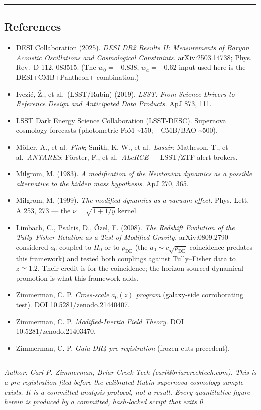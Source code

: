 \documentclass[
]{article}
\providecommand{\tightlist}{%
  \setlength{\itemsep}{0pt}\setlength{\parskip}{0pt}}
\begin{document}
\begin{center}\rule{0.5\linewidth}{0.5pt}\end{center}

\subsection{References}\label{references}

\begin{itemize}
\tightlist
\item
  DESI Collaboration (2025). \emph{DESI DR2 Results II: Measurements of
  Baryon Acoustic Oscillations and Cosmological Constraints.}
  arXiv:2503.14738; Phys. Rev.~D 112, 083515. (The
  \(w_0=-0.838,\,w_a=-0.62\) input used here is the DESI+CMB+Pantheon+
  combination.)
\item
  Ivezić, Ž., et al.~(LSST/Rubin) (2019). \emph{LSST: From Science
  Drivers to Reference Design and Anticipated Data Products.} ApJ 873,
  111.
\item
  LSST Dark Energy Science Collaboration (LSST-DESC). Supernova
  cosmology forecasts (photometric FoM \textasciitilde150; +CMB/BAO
  \textasciitilde500).
\item
  Möller, A., et al.~\emph{Fink}; Smith, K. W., et al.~\emph{Lasair};
  Matheson, T., et al.~\emph{ANTARES}; Förster, F., et al.~\emph{ALeRCE}
  --- LSST/ZTF alert brokers.
\item
  Milgrom, M. (1983). \emph{A modification of the Newtonian dynamics as
  a possible alternative to the hidden mass hypothesis.} ApJ 270, 365.
\item
  Milgrom, M. (1999). \emph{The modified dynamics as a vacuum effect.}
  Phys. Lett. A 253, 273 --- the \(\nu=\sqrt{1+1/y}\) kernel.
\item
  Limbach, C., Psaltis, D., Özel, F. (2008). \emph{The Redshift
  Evolution of the Tully--Fisher Relation as a Test of Modified
  Gravity.} arXiv:0809.2790 --- considered \(a_0\) coupled to \(H_0\) or
  to \(\rho_\mathrm{DE}\) (the \(a_0\sim c\sqrt{\rho_\mathrm{DE}}\)
  coincidence predates this framework) and tested both couplings against
  Tully--Fisher data to \(z\simeq1.2\). Their credit is for the
  coincidence; the horizon-sourced dynamical promotion is what this
  framework adds.
\item
  Zimmerman, C. P. \emph{Cross-scale \(a_0(z)\) program} (galaxy-side
  corroborating test). DOI 10.5281/zenodo.21440407.
\item
  Zimmerman, C. P. \emph{Modified-Inertia Field Theory.} DOI
  10.5281/zenodo.21403470.
\item
  Zimmerman, C. P. \emph{Gaia-DR4 pre-registration} (frozen-cuts
  precedent).
\end{itemize}

\begin{center}\rule{0.5\linewidth}{0.5pt}\end{center}

\emph{Author: Carl P. Zimmerman, Briar Creek Tech
(carl@briarcreektech.com). This is a pre-registration filed before the
calibrated Rubin supernova cosmology sample exists. It is a committed
analysis protocol, not a result. Every quantitative figure herein is
produced by a committed, hash-locked script that exits 0.}
\end{document}
